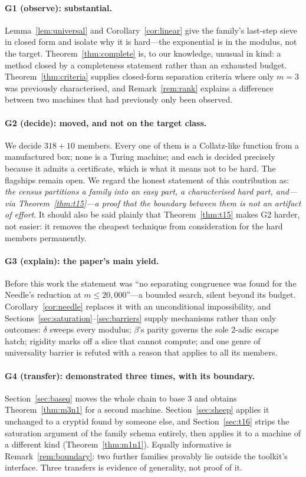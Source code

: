 \documentclass[11pt]{article}
\theoremstyle{definition}
\theoremstyle{remark}
\begin{document}
\paragraph{G1 (observe): substantial.}
Lemma~\ref{lem:universal} and Corollary~\ref{cor:linear} give the family's
last-step sieve in closed form and isolate why it is hard---the exponential is
in the modulus, not the target.  Theorem~\ref{thm:complete} is, to our
knowledge, unusual in kind: a method closed by a completeness statement rather
than an exhausted budget.  Theorem~\ref{thm:criteria} supplies closed-form
separation criteria where only $m=3$ was previously characterised, and
Remark~\ref{rem:rank} explains a difference between two machines that had
previously only been observed.

\paragraph{G2 (decide): moved, and not on the target class.}
We decide $318+10$ members.  Every one of them is a Collatz-like function from
a manufactured box; none is a Turing machine; and each is decided precisely
because it admits a certificate, which is what it means not to be hard.  The
flagships remain open.  We regard the honest statement of this contribution as:
\emph{the census partitions a family into an easy part, a characterised hard
part, and---via Theorem~\ref{thm:t15}---a proof that the boundary between them
is not an artifact of effort}.  It should also be said plainly that
Theorem~\ref{thm:t15} makes G2 harder, not easier: it removes the cheapest
technique from consideration for the hard members permanently.

\paragraph{G3 (explain): the paper's main yield.}
Before this work the statement was ``no separating congruence was found for the
Needle's reduction at $m\le20{,}000$''---a bounded search, silent beyond its
budget.  Corollary~\ref{cor:needle} replaces it with an unconditional
impossibility, and Sections~\ref{sec:saturation}--\ref{sec:barriers} supply
mechanisms rather than only outcomes: $\delta$ sweeps every modulus; $\beta$'s
parity governs the sole $2$-adic escape hatch; rigidity marks off a slice that
cannot compute; and one genre of universality barrier is refuted with a reason
that applies to all its members.

\paragraph{G4 (transfer): demonstrated three times, with its boundary.}
Section~\ref{sec:baseq} moves the whole chain to base $3$ and obtains
Theorem~\ref{thm:m3n1} for a second machine.  Section~\ref{sec:sheep} applies
it unchanged to a cryptid found by someone else, and
Section~\ref{sec:t16} strips the saturation argument of the family schema
entirely, then applies it to a machine of a different kind
(Theorem~\ref{thm:m1n1}).  Equally informative is Remark~\ref{rem:boundary}:
two further families provably lie outside the toolkit's interface.  Three
transfers is evidence of generality, not proof of it.
\end{document}
